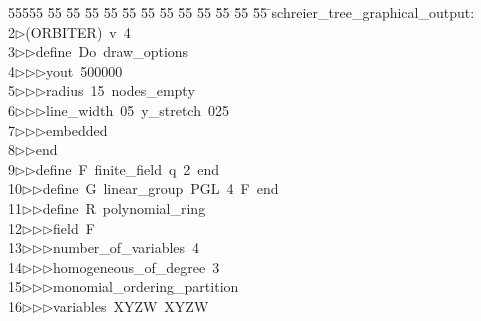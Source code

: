 %
%
\begin{tabbing}
55555 \= 55 \= 55 \= 55 \= 55 \= 55 \= 55 \= 55 \= 55 \= 55 \= 55 \= 55 \= 55 \= \>schreier\_tree\_graphical\_output:\\[0pt]
2\>$\triangleright$\>(ORBITER)\ v\ 4\ \\[0pt]
3\>$\triangleright$\>$\triangleright$\>define\ Do\ draw\_options\ \\[0pt]
4\>$\triangleright$\>$\triangleright$\>$\triangleright$\>yout\ 500000\ \\[0pt]
5\>$\triangleright$\>$\triangleright$\>$\triangleright$\>radius\ 15\ nodes\_empty\ \\[0pt]
6\>$\triangleright$\>$\triangleright$\>$\triangleright$\>line\_width\ 05\ y\_stretch\ 025\ \\[0pt]
7\>$\triangleright$\>$\triangleright$\>$\triangleright$\>embedded\ \\[0pt]
8\>$\triangleright$\>$\triangleright$\>end\ \\[0pt]
9\>$\triangleright$\>$\triangleright$\>define\ F\ finite\_field\ q\ 2\ end\ \\[0pt]
10\>$\triangleright$\>$\triangleright$\>define\ G\ linear\_group\ PGL\ 4\ F\ end\ \\[0pt]
11\>$\triangleright$\>$\triangleright$\>define\ R\ polynomial\_ring\ \\[0pt]
12\>$\triangleright$\>$\triangleright$\>$\triangleright$\>field\ F\ \\[0pt]
13\>$\triangleright$\>$\triangleright$\>$\triangleright$\>number\_of\_variables\ 4\ \\[0pt]
14\>$\triangleright$\>$\triangleright$\>$\triangleright$\>homogeneous\_of\_degree\ 3\ \\[0pt]
15\>$\triangleright$\>$\triangleright$\>$\triangleright$\>monomial\_ordering\_partition\ \\[0pt]
16\>$\triangleright$\>$\triangleright$\>$\triangleright$\>variables\ XYZW\ XYZW\ \\[0pt]

\end{tabbing}
